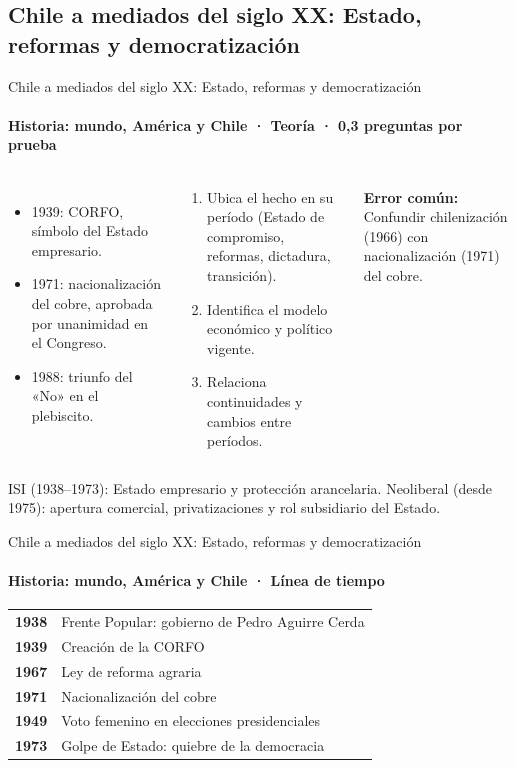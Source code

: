\documentclass[aspectratio=169,11pt]{beamer}
\makeatletter
\newenvironment{lineatiempo}
  {\footnotesize\renewcommand{\arraystretch}{1.15}\begin{tabular}{@{}>{\leavevmode\bfseries\color{zinc700}}p{0.14\textwidth}p{0.74\textwidth}@{}}}
  {\end{tabular}}
\newlength{\ajustealto}
\newenvironment{ajustar}[1][0.74\textheight]
  {\setlength{\ajustealto}{#1}\begin{lrbox}{\ajustecaja}\begin{minipage}{\textwidth}}
  {\end{minipage}\end{lrbox}%
   \ifdim\dimexpr\ht\ajustecaja+\dp\ajustecaja\relax>\ajustealto
     \resizebox*{!}{\ajustealto}{\usebox{\ajustecaja}}\else\usebox{\ajustecaja}\fi}
\makeatother
\begin{document}
\subsection{Chile a mediados del siglo XX: Estado, reformas y democratización}

\begin{frame}{Chile a mediados del siglo XX: Estado, reformas y democratización}
\label{tema-hi-chile-xx}
\framesubtitle{Historia: mundo, América y Chile · Teoría · 0,3 preguntas por prueba}
\begin{ajustar}
\begin{columns}[T,onlytextwidth]
\begin{itemize}\footnotesize
\item 1939: CORFO, símbolo del Estado empresario.
\item 1971: nacionalización del cobre, aprobada por unanimidad en el Congreso.
\item 1988: triunfo del «No» en el plebiscito.
\end{itemize}
\begin{cajaregla}\scriptsize \begin{enumerate}\item Ubica el hecho en su período (Estado de compromiso, reformas, dictadura, transición).\item Identifica el modelo económico y político vigente.\item Relaciona continuidades y cambios entre períodos.\end{enumerate}\end{cajaregla}
\begin{notagris}\scriptsize \textbf{Error común:} Confundir chilenización (1966) con nacionalización (1971) del cobre.\end{notagris}
\end{columns}
\begin{cajaclave}\footnotesize
ISI (1938–1973): Estado empresario y protección arancelaria. Neoliberal (desde 1975): apertura comercial, privatizaciones y rol subsidiario del Estado.
\end{cajaclave}
\end{ajustar}
\end{frame}

\begin{frame}{Chile a mediados del siglo XX: Estado, reformas y democratización}
\framesubtitle{Historia: mundo, América y Chile · Línea de tiempo}
\begin{lineatiempo}
1938 & Frente Popular: gobierno de Pedro Aguirre Cerda \\
1939 & Creación de la CORFO \\
1967 & Ley de reforma agraria \\
1971 & Nacionalización del cobre \\
1949 & Voto femenino en elecciones presidenciales \\
1973 & Golpe de Estado: quiebre de la democracia \\
\end{lineatiempo}
\end{frame}
\end{document}
